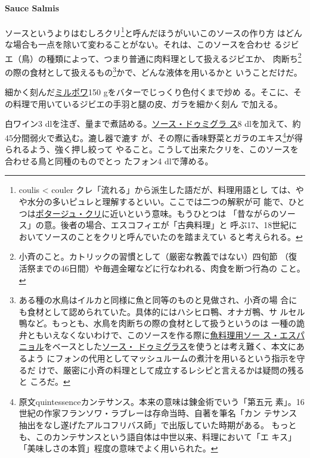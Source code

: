 \hypertarget{sauce-salmis}{%
\paragraph{Sauce Salmis}\label{sauce-salmis}}

  

ソースというよりはむしろクリ\footnote{coulis \textless{} couler
  クレ「流れる」から派生した語だが、料理用語とし
  ては、やや水分の多いピュレと理解するといい。ここでは二つの解釈が可
  能で、ひとつは\href{}{ポタージュ・クリ}に近いという意味。もうひとつは
  「昔ながらのソース」の意。後者の場合、エスコフィエが「古典料理」と
  呼ぶ17、18世紀においてソースのことをクリと呼んでいたのを踏まえてい
  ると考えられる。}と呼んだほうがいいこのソースの作り方
はどんな場合も一点を除いて変わることがない。それは、このソースを合わせ
るジビエ（鳥）の種類によって、つまり普通に肉料理として扱えるジビエか、
肉断ち\footnote{小斉のこと。カトリックの習慣として（厳密な教義ではない）四旬節
  （復活祭までの46日間）や毎週金曜などに行なわれる、肉食を断つ行為の
  こと。}の際の食材として扱えるもの\footnote{ある種の水鳥はイルカと同様に魚と同等のものと見做され、小斉の場
  合にも食材として認められていた。具体的にはハシヒロ鴨、オナガ鴨、サ
  ルセル鴨など。もっとも、水鳥を肉断ちの際の食材として扱うというのは
  一種の詭弁ともいえなくないわけで、このソースを作る際に\protect\hyperlink{sauce-espagnole-maigre}{魚料理用ソー
  ス・エスパニョル}をベースとした\protect\hyperlink{sauce-demi-glace}{ソース・
  ドゥミグラス}を使うとは考え難く、本文にあるよう
  にフォンの代用としてマッシュルームの煮汁を用いるという指示を守るだ
  けで、厳密に小斉の料理として成立するレシピと言えるかは疑問の残ると
  ころだ。}かで、どんな液体を用いるかと いうことだけだ。

細かく刻んだ\protect\hyperlink{mirepoix}{ミルポワ}150
gをバターでじっくり色付くまで炒め
る。そこに、その料理で用いているジビエの手羽と腿の皮、ガラを細かく刻ん
で加える。

白ワイン3
dlを注ぎ、\untiers{}量まで煮詰める。\protect\hyperlink{sauce-demi-glace}{ソース・ドゥミグラ
ス}8 dlを加えて、約45分間弱火で煮込む。漉し器で漉す
が、その際に香味野菜とガラのエキス\footnote{原文quintessenceカンテサンス。本来の意味は錬金術でいう「第五元
  素」。16世紀の作家フランソワ・ラブレーは存命当時、自著を筆名「カン
  テサンス抽出をなし遂げたアルコフリバス師」で出版していた時期がある。
  もっとも、このカンテサンスという語自体は中世以来、料理において「エ
  キス」「美味しさの本質」程度の意味でよく用いられた。}が得られるよう、強く押し絞って
やること。こうして出来たクリを、このソースを合わせる鳥と同種のものでとっ
たフォン4 dlで薄める。

